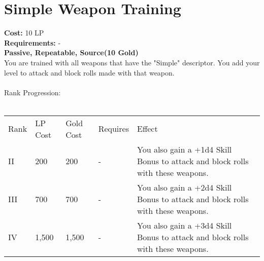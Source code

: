 \section{Simple Weapon Training}\label{perk:simpleWeaponTraining}
\textbf{Cost:} 10 LP\\
\textbf{Requirements:} -\\
\textbf{Passive, Repeatable, Source(10 Gold)}\\
You are trained with all weapons that have the "Simple" descriptor.
You add your level to attack and block rolls made with that weapon.\\
\\
Rank Progression:\\
\\
\begin{longtable}{l | l | l | l | p{9cm}}
	Rank & LP Cost & Gold Cost & Requires & Effect\\
	II & 200 & 200 & - & You also gain a +1d4 Skill Bonus to attack and block rolls with these weapons.\\
	III & 700 & 700 & - & You also gain a +2d4 Skill Bonus to attack and block rolls with these weapons.\\
	IV & 1,500 & 1,500 & - & You also gain a +3d4 Skill Bonus to attack and block rolls with these weapons.\\
\end{longtable}
